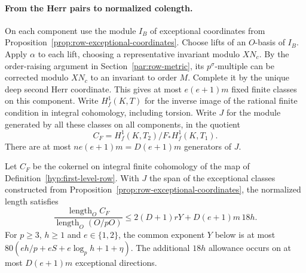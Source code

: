 \paragraph{From the Herr pairs to normalized colength.}
\label{par:row-colength}
On each component use the module \(I_B\) of exceptional coordinates
from Proposition~\ref{prop:row-exceptional-coordinates}. Choose lifts
of an \(O\)-basis of \(I_B\).
Apply \(\alpha\) to each lift, choosing a representative invariant
modulo \(XN_c\). By the order-raising argument in
Section~\ref{par:row-metric}, its \(p^\sigma\)-multiple can be
corrected modulo \(XN_c\) to an invariant to order \(M\).
Complete it by the unique deep second Herr coordinate. This gives
at most \(e(e+1)m\) fixed finite classes on this component.
Write \(H^1_f(K,T)\) for the inverse image of the rational
finite condition in integral cohomology, including torsion.
Write \(J\) for the module generated by all these classes on all
components, in the quotient
\[
              C_F=H^1_f(K,T_2)/F_*H^1_f(K,T_1).
\]
There are at most \(ne(e+1)m=D(e+1)m\) generators of \(J\).

\begin{proposition}\label{prop:local-row-colength}
Let \(C_F\) be the cokernel on integral finite cohomology
of the map of Definition~\ref{hyp:first-level-row}. With
\(J\) the span of the exceptional classes constructed from
Proposition~\ref{prop:row-exceptional-coordinates}, the
normalized length satisfies
\[
 \frac{\operatorname{length}_O C_F}{\operatorname{length}_O(O/pO)}
       \le 2(D+1)rY+D(e+1)m\,18h .
\]
For \(p\ge3\), \(h\ge1\) and \(e\in\{1,2\}\), the common exponent
\(Y\) below is at most \(80(eh/p+eS+e\log_p h+1+\eta)\).
The additional \(18h\) allowance occurs on at most \(D(e+1)m\)
exceptional directions.
\end{proposition}

